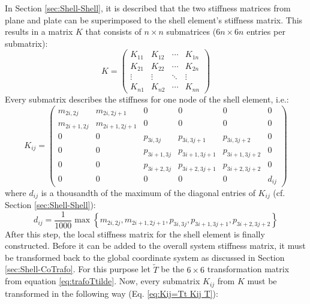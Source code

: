   In Section \ref{sec:Shell-Shell}, it is described that the two stiffness matrices from plane and plate can be superimposed to the shell element's stiffness matrix. This results in a matrix $K$ that consists of $n\!\times\! n$ submatrices ($6n\!\times\! 6n$ entries per submatrix):
   \begin{equation*}
   K = \begin{pmatrix}
   K_{11} & K_{12} & \cdots & K_{1n}\\
   K_{21} & K_{22} & \cdots & K_{2n}\\
   \vdots & \vdots & \ddots & \vdots\\
   K_{n1} & K_{n2} & \cdots & K_{nn}
   \end{pmatrix}
   \end{equation*}
   Every submatrix describes the stiffness for one node of the shell element, i.e.:
   \begin{equation*}
   K_{ij} = \begin{pmatrix}
   m_{2i,2j}   & m_{2i,2j+1}   & 0           & 0             & 0             & 0\\
   m_{2i+1,2j} & m_{2i+1,2j+1} & 0           & 0             & 0             & 0\\
   0           & 0             & p_{3i,3j}   & p_{3i,3j+1}   & p_{3i,3j+2}   & 0\\
   0           & 0             & p_{3i+1,3j} & p_{3i+1,3j+1} & p_{3i+1,3j+2} & 0\\
   0           & 0             & p_{3i+2,3j} & p_{3i+2,3j+1} & p_{3i+2,3j+2} & 0\\
   0           & 0             & 0           & 0             & 0             & d_{ij}
   \end{pmatrix}
   \end{equation*}
   where $d_{ij}$ is a thousandth of the maximum of the diagonal entries of $K_{ij}$ (cf. Section \ref{sec:Shell-Shell}):
   \begin{equation*}
   d_{ij} = \frac{1}{1000}\max \left\lbrace m_{2i,2j}, m_{2i+1,2j+1}, p_{3i,3j}, p_{3i+1,3j+1}, p_{3i+2,3j+2} \right\rbrace 
   \end{equation*}
   After this step, the local stiffness matrix for the shell element is finally constructed. Before it can be added to the overall system stiffness matrix, it must be transformed back to the global coordinate system as discussed in Section \ref{sec:Shell-CoTrafo}.
   For this purpose let $\tilde{T}$ be the $6\!\times\! 6$ transformation matrix from equation \eqref{eq:trafoTtilde}. Now, every submatrix $K_{ij}$ from $K$ must be transformed in the following way (Eq. \eqref{eq:Kij=Tt Kij T}):
